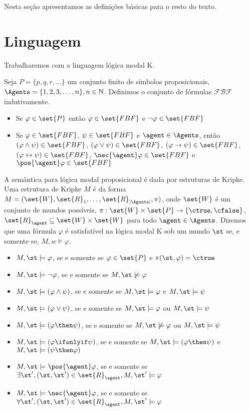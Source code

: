 
Nesta seção apresentamos as definições básicas para o resto do texto.

\section{Linguagem}
Trabalharemos com a linguagem lógica modal K.

\begin{definition}
Seja $P = \{p, q, r, \dots\}$ um conjunto finito de símbolos proposicionais, $\Agents = \{1, 2, 3, \dots, n\}, n \in \mathbb{N}$. Definimos o conjunto de fórmulas $\mathcal{FBF}$ indutivamente.

\begin{itemize}
\item Se $\varphi \in \set{P}$ então $\varphi \in \set{FBF}$ e $\neg\varphi \in \set{FBF}$
\item Se $\varphi \in \set{FBF}$, $\psi \in \set{FBF}$ e $\agent \in \Agents$, então $(\varphi \land \psi) \in \set{FBF}$, $(\varphi \lor \psi) \in \set{FBF}$, $(\varphi \rightarrow \psi) \in \set{FBF}$, $(\varphi \leftrightarrow \psi) \in \set{FBF}$, $\nec{\agent} \varphi \in \set{FBF}$ e $\pos{\agent} \varphi \in \set{FBF}$
\end{itemize}
\end{definition}


A semântica para lógica modal proposicional é dada por estruturas de Kripke. Uma estrutura de Kripke $M$ é da forma $M = (\set{W}, \set{R}_1, \ldots, \set{R}_{|\Agents|}, \pi)$, onde %
$\set{W}$ é um conjunto de mundos possíveis, $\pi:\set{W} \times \set{P} \rightarrow \{\ctrue, \cfalse\}$, $\set{R}_\agent \subseteq \set{W} \times \set{W}$ para todo $\agent \in \Agents$. Dizemos que uma fórmula $\varphi$ é satisfatível na lógica modal K sob um mundo $\st$ se, e somente se, $M,w \models \varphi$.

\begin{itemize}
\item $M,\st \models \varphi$, se e somente se $\varphi \in \set{P}$ e $\pi(\st, \varphi) = \ctrue$
\item $M,\st \models \neg\varphi$, se e somente se $M,\st \not\models \varphi$
\item $M,\st \models (\varphi \land \psi)$, se e somente se $M,\st \models \varphi$ e $M,\st \models \psi $
\item $M,\st \models (\varphi \lor \psi)$, se e somente se $M,\st \models \varphi$ ou $M,\st \models \psi $
\item $M,\st \models (\varphi \then \psi)$, se e somente se $M,\st \not\models \varphi$ ou $M,\st \models \psi $
\item $M,\st \models (\varphi \ifonlyif \psi)$, se e somente se $M,\st \models (\varphi \then \psi)$ e $M,\st \models (\psi \then \varphi)$

\item $M,\st \models \pos{\agent}\varphi$, se e somente se $\exists\st', (\st, \st') \in \set{R}_\agent, M,\st' \models \varphi$
\item $M,\st \models \nec{\agent}\varphi$, se e somente se $\forall\st', (\st, \st') \in \set{R}_\agent, M,\st' \models \varphi$

\end{itemize}

